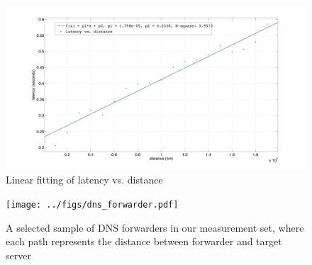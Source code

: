 \begin{figure}
  \centering
  \includegraphics[width=\linewidth]{../figs/fit_curve.pdf}
  \caption{Linear fitting of latency vs. distance}
  \label{fig:fit_curve}
\end{figure}

\begin{figure}[t]
  \centering
  \texttt{[image: ../figs/dns\_forwarder.pdf]}
  \caption{A selected sample of DNS forwarders in our measurement set, where each path represents the distance between forwarder and target server}
  \label{fig:forwarder_viz}
\end{figure}

